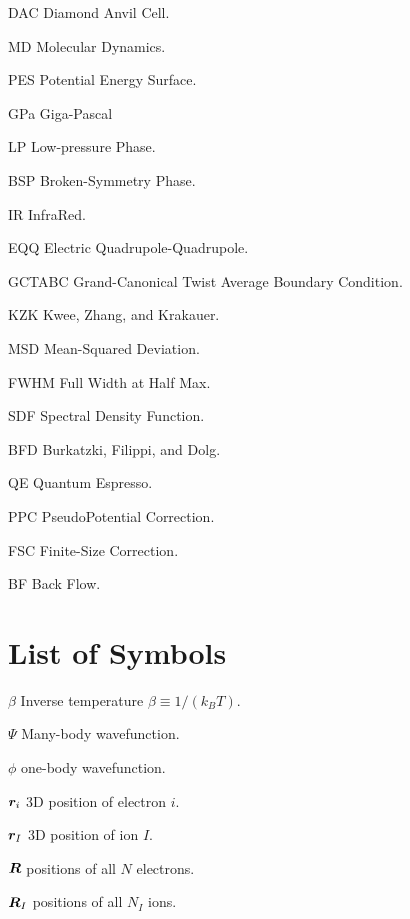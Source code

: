 \begin{symbollist*}
\item[DAC] Diamond Anvil Cell.
\item[MD] Molecular Dynamics.
\item[PES] Potential Energy Surface.
\item[GPa] Giga-Pascal
\item[LP] Low-pressure Phase.
\item[BSP] Broken-Symmetry Phase.
\item[IR] InfraRed.
\item[EQQ] Electric Quadrupole-Quadrupole.
\item[GCTABC] Grand-Canonical Twist Average Boundary Condition.
\item[KZK] Kwee, Zhang, and Krakauer.
\item[MSD] Mean-Squared Deviation.
\item[FWHM] Full Width at Half Max.
\item[SDF] Spectral Density Function.
\item[BFD] Burkatzki, Filippi, and Dolg.
\item[QE] Quantum Espresso.
\item[PPC] PseudoPotential Correction.
\item[FSC] Finite-Size Correction.
\item[BF] Back Flow.

\end{symbollist*}

\chapter{List of Symbols}

\begin{symbollist}[0.7in]
\item[$\beta$] Inverse temperature $\beta\equiv 1/(k_B T)$.
\item[$\Psi$] Many-body wavefunction.
\item[$\phi$] one-body wavefunction.
\item[$\boldsymbol{r}_i$] 3D position of electron $i$.
\item[$\boldsymbol{r}_I$] 3D position of ion $I$.
\item[$\boldsymbol{R}$] positions of all $N$ electrons.
\item[$\boldsymbol{R}_I$] positions of all $N_I$ ions.
\end{symbollist}